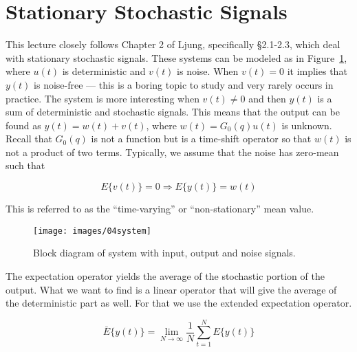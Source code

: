 \mainmatter%
\setcounter{page}{1}

\lectureseries[\course]{\course}

\date{October 6, 2009}

\setaddress%

\setcounter{lecture}{3}
\setcounter{chapter}{3}


\section{Stationary Stochastic Signals}
This lecture closely follows Chapter 2 of Ljung, specifically \S2.1-2.3, which deal with stationary stochastic signals.%
These systems can be modeled as in Figure~\ref{fig:04system}, where $u(t)$ is deterministic and $v(t)$ is noise.
When $v(t)=0$ it implies that $y(t)$ is noise-free --- this is a boring topic to study and very rarely occurs in practice.
The system is more interesting when $v(t)\neq 0$ and then $y(t)$ is a sum of deterministic and stochastic signals.
This means that the output can be found as $y(t)=w(t)+v(t)$, where $w(t)=G_0(q)u(t)$ is unknown.
Recall that $G_0(q)$ is not a function but is a time-shift operator so that $w(t)$ is not a product of two terms.
Typically, we assume that the noise has zero-mean such that

\begin{equation*}
E\{v(t)\}=0 \Rightarrow E\{y(t)\}=w(t)
\end{equation*}

This is referred to as the ``time-varying'' or ``non-stationary'' mean value.
\begin{figure}[ht!]
\centering
\texttt{[image: images/04system]}
\caption{Block diagram of system with input, output and noise signals.}%
\label{fig:04system}
\end{figure}

The expectation operator yields the average of the stochastic portion of the output.
What we want to find is a linear operator that will give the average of the deterministic part as well.
For that we use the extended expectation operator.

\begin{equation*}
\bar{E}\{y(t)\} = \lim_{N\to\infty}\frac{1}{N}\sum_{t=1}^N E\{y(t)\}
\end{equation*}

